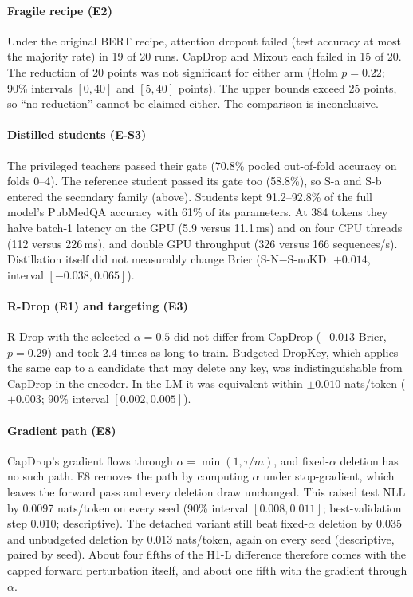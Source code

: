 \paragraph{Fragile recipe (E2)}
Under the original BERT recipe, attention dropout failed (test accuracy at most the majority rate) in 19 of 20 runs.
CapDrop and Mixout each failed in 15 of 20. The reduction of 20 points was not significant for either arm
(Holm $p=0.22$; 90\% intervals $[0, 40]$ and $[5, 40]$ points). The upper bounds exceed 25 points, so ``no reduction''
cannot be claimed either. The comparison is inconclusive.

\paragraph{Distilled students (E-S3)}
The privileged teachers passed their gate (70.8\% pooled out-of-fold accuracy on folds 0--4). The reference
student passed its gate too (58.8\%), so S-a and S-b entered the secondary family (above). Students kept 91.2--92.8\% of the
full model's PubMedQA accuracy with 61\% of its parameters. At 384 tokens they halve batch-1 latency on the GPU
(5.9 versus 11.1\,ms) and on four CPU threads (112 versus 226\,ms), and double GPU throughput (326 versus 166 sequences/s).
Distillation itself did not measurably change Brier (S-N$-$S-noKD: $+0.014$, interval $[-0.038, 0.065]$).

\paragraph{R-Drop (E1) and targeting (E3)}
R-Drop with the selected $\alpha=0.5$ did not differ from CapDrop ($-0.013$ Brier, $p=0.29$) and took 2.4 times
as long to train. Budgeted DropKey, which applies the same cap to a candidate that may delete any key, was
indistinguishable from CapDrop in the encoder. In the LM it was equivalent within $\pm0.010$ nats/token
($+0.003$; 90\% interval $[0.002, 0.005]$).

\paragraph{Gradient path (E8)}
CapDrop's gradient flows through $\alpha=\min(1,\tau/m)$, and fixed-$\alpha$ deletion has no such path. E8 removes the path
by computing $\alpha$ under stop-gradient, which leaves the forward pass and every deletion draw unchanged. This raised test NLL by
0.0097 nats/token on every seed (90\% interval $[0.008, 0.011]$; best-validation step 0.010; descriptive). The
detached variant still beat fixed-$\alpha$ deletion by 0.035 and unbudgeted deletion by 0.013 nats/token, again on every
seed (descriptive, paired by seed). About four fifths of the H1-L difference therefore comes with the capped forward
perturbation itself, and about one fifth with the gradient through $\alpha$.

